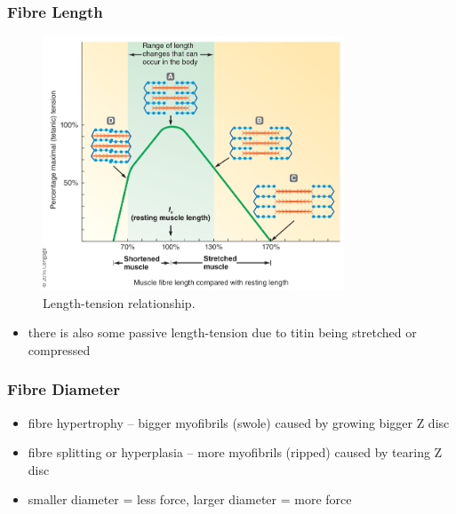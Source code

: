 \documentclass[10pt]{article}
\begin{document}
\subsubsection{Fibre Length}
\begin{figure}[H]
    \centering
    \includegraphics[width=0.8\textwidth]{muscleLengthTension}
    \caption{Length-tension relationship.}
    \label{fig:muscleLengthTension}
\end{figure}
\begin{itemize}
    \item there is also some passive length-tension due to titin being stretched or compressed
\end{itemize}

\subsubsection{Fibre Diameter}
\begin{itemize}
    \item fibre hypertrophy -- bigger myofibrils (swole) caused by growing bigger Z disc
    \item fibre splitting or hyperplasia -- more myofibrils (ripped) caused by tearing Z disc
    \item smaller diameter = less force, larger diameter = more force
\end{itemize}
\end{document}

